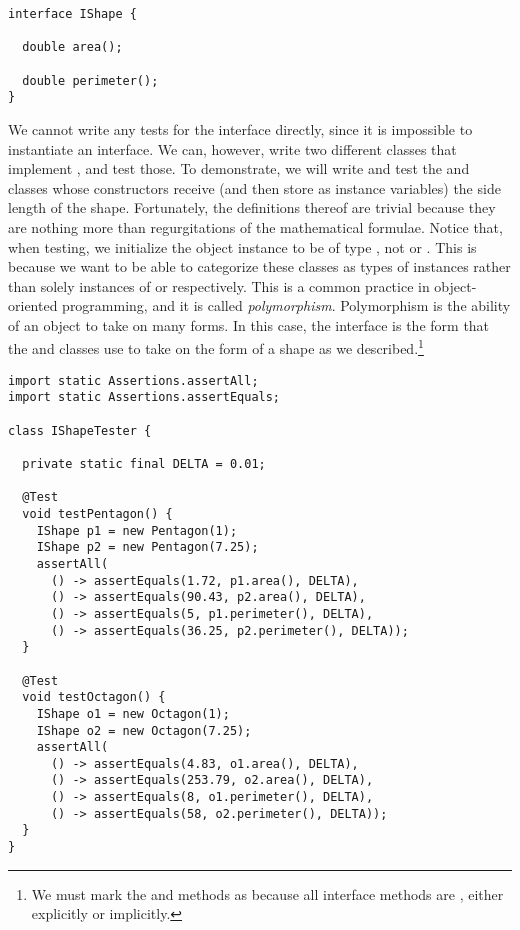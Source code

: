 \begin{lstlisting}[language=MyJava]
interface IShape {

  double area();

  double perimeter();
}
\end{lstlisting}

We cannot write any tests for the  interface directly, since it is impossible to instantiate an interface. We can, however, write two different classes that implement , and test those. To demonstrate, we will write and test the  and  classes whose constructors receive (and then store as instance variables) the side length of the shape. Fortunately, the definitions thereof are trivial because they are nothing more than regurgitations of the mathematical formulae. Notice that, when testing, we initialize the object instance to be of type , not  or . This is because we want to be able to categorize these classes as types of  instances rather than solely instances of  or  respectively. This is a common practice in object-oriented programming, and it is called \emph{polymorphism}. Polymorphism is the ability of an object to take on many forms. In this case, the  interface is the form that the  and  classes use to take on the form of a shape as we described.\footnote{We must mark the  and  methods as  because all interface methods are , either explicitly or implicitly.}

\begin{lstlisting}[language=MyJava]
import static Assertions.assertAll;
import static Assertions.assertEquals;

class IShapeTester {

  private static final DELTA = 0.01;
  
  @Test
  void testPentagon() {
    IShape p1 = new Pentagon(1);
    IShape p2 = new Pentagon(7.25);
    assertAll(
      () -> assertEquals(1.72, p1.area(), DELTA),
      () -> assertEquals(90.43, p2.area(), DELTA),
      () -> assertEquals(5, p1.perimeter(), DELTA),
      () -> assertEquals(36.25, p2.perimeter(), DELTA));
  }

  @Test
  void testOctagon() {
    IShape o1 = new Octagon(1);
    IShape o2 = new Octagon(7.25);
    assertAll(
      () -> assertEquals(4.83, o1.area(), DELTA),
      () -> assertEquals(253.79, o2.area(), DELTA),
      () -> assertEquals(8, o1.perimeter(), DELTA),
      () -> assertEquals(58, o2.perimeter(), DELTA));
  }
}
\end{lstlisting}

